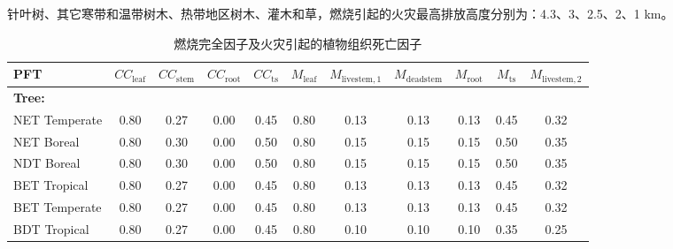 针叶树、其它寒带和温带树木、热带地区树木、灌木和草，燃烧引起的火灾最高排放高度分别为：4.3、3、2.5、2、1 km。
\begin{landscape}
  \begin{table}[htbp]
    \caption{燃烧完全因子及火灾引起的植物组织死亡因子}
    \label{tab:burning_factors}
    \begin{tabular}{lcccccccccc}
      \toprule
      PFT                                   & $CC_{\mathrm{leaf}}$ & $CC_{\mathrm{stem}}$ & $CC_{\mathrm{root}}$ & $CC_{\mathrm{ts}}$ & $M_{\mathrm{leaf}}$ & $M_{\mathrm{livestem,1}}$ & $M_{\mathrm{deadstem}}$ & $M_{\mathrm{root}}$ & $M_{\mathrm{ts}}$ & $M_{\mathrm{livestem,2}}$ \\ \midrule
      \multicolumn{11}{l}{\textbf{Tree:}}  \\
      NET Temperate                         & 0.80                 & 0.27                 & 0.00                 & 0.45               & 0.80                & 0.13                      & 0.13                    & 0.13                & 0.45              & 0.32                      \\
      NET Boreal                            & 0.80                 & 0.30                 & 0.00                 & 0.50               & 0.80                & 0.15                      & 0.15                    & 0.15                & 0.50              & 0.35                      \\
      NDT Boreal                            & 0.80                 & 0.30                 & 0.00                 & 0.50               & 0.80                & 0.15                      & 0.15                    & 0.15                & 0.50              & 0.35                      \\
      BET Tropical                          & 0.80                 & 0.27                 & 0.00                 & 0.45               & 0.80                & 0.13                      & 0.13                    & 0.13                & 0.45              & 0.32                      \\
      BET Temperate                         & 0.80                 & 0.27                 & 0.00                 & 0.45               & 0.80                & 0.13                      & 0.13                    & 0.13                & 0.45              & 0.32                      \\
      BDT Tropical                          & 0.80                 & 0.27                 & 0.00                 & 0.45               & 0.80                & 0.10                      & 0.10                    & 0.10                & 0.35              & 0.25                      \\

\end{tabular}
\end{table}
\end{landscape}

